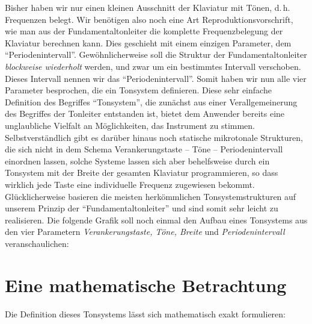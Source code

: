 Bisher haben wir nur einen kleinen Ausschnitt der Klaviatur mit Tönen,
d.\,h. Frequenzen belegt. Wir benötigen also noch eine Art
Reproduktionsvorschrift, wie man aus der Fundamentaltonleiter die komplette
Frequenzbelegung der Klaviatur
berechnen kann. Dies geschieht mit einem einzigen Parameter, dem
"`Periodenintervall"'. Gewöhnlicherweise soll die Struktur der
Fundamentaltonleiter \emph{blockweise wiederholt} werden, und zwar um
ein bestimmtes Intervall verschoben. Dieses Intervall nennen wir das
"`Periodenintervall"'.  Somit haben wir nun
alle vier Parameter besprochen, die ein Tonsystem definieren. Diese
sehr einfache Definition des Begriffes "`Tonsystem"', die zunächst aus
einer Verallgemeinerung des Begriffes der Tonleiter entstanden ist,
bietet dem Anwender bereits eine unglaubliche Vielfalt an
Möglichkeiten, das Instrument zu stimmen. Selbstverständlich gibt es
darüber hinaus noch statische mikrotonale Strukturen, die sich nicht in
dem Schema Verankerungstaste -- Töne -- Periodenintervall einordnen
lassen, solche Systeme lassen sich aber behelfsweise durch ein
Tonsystem mit der Breite der gesamten Klaviatur programmieren, so dass
wirklich jede Taste eine individuelle Frequenz zugewiesen bekommt.
Glücklicherweise basieren die meisten herkömmlichen
Tonsystemstrukturen auf unserem Prinzip der "`Fundamentaltonleiter"'
und sind somit sehr leicht zu realisieren. Die folgende Grafik soll
noch einmal den Aufbau eines Tonsystems aus den vier Parametern {\it
  Verankerungstaste, Töne, Breite \/} und \emph{Periodenintervall}
veranschaulichen:

\begin{center}

\end{center}

\section{Eine mathematische Betrachtung}\label{sec:eine-math-betr}
Die Definition dieses Tonsystems lässt sich mathematisch exakt
formulieren:
\label{MATHE}


